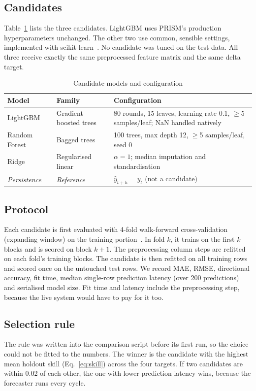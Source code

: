 \documentclass[conference]{IEEEtran}
\begin{document}
\subsection{Candidates}
Table~\ref{tab:cands} lists the three candidates. LightGBM uses PRISM's
production hyperparameters unchanged. The other two use common, sensible
settings, implemented with scikit-learn~\cite{pedregosa2011sklearn}. No
candidate was tuned on the test data. All three receive exactly the same
preprocessed feature matrix and the same delta target.

\begin{table}[t]
\centering
\caption{Candidate models and configuration}
\label{tab:cands}
\begin{tabular}{@{}p{1.7cm}p{2.4cm}p{3.2cm}@{}}
\toprule
Model & Family & Configuration \\
\midrule
LightGBM~\cite{ke2017lightgbm} & Gradient-boosted trees & 80 rounds, 15 leaves, learning rate 0.1, $\ge$5 samples/leaf; NaN handled natively \\
Random Forest~\cite{breiman2001rf} & Bagged trees & 100 trees, max depth 12, $\ge$5 samples/leaf, seed 0 \\
Ridge~\cite{hoerl1970ridge} & Regularised linear & $\alpha=1$; median imputation and standardisation \\
\midrule
\textit{Persistence} & \textit{Reference} & $\hat y_{t+h}=y_t$ (not a candidate) \\
\bottomrule
\end{tabular}
\end{table}

\subsection{Protocol}
Each candidate is first evaluated with 4-fold walk-forward cross-validation
(expanding window) on the training portion~\cite{tashman2000,bergmeir2012}. In
fold $k$, it trains on the first $k$ blocks and is scored on block $k{+}1$.
The preprocessing column steps are refitted on each fold's training blocks. The
candidate is then refitted on all training rows and scored once on the
untouched test rows. We record MAE, RMSE, directional accuracy, fit time,
median single-row prediction latency (over 200 predictions) and serialised
model size. Fit time and latency include the preprocessing step, because the
live system would have to pay for it too.

\subsection{Selection rule}
The rule was written into the comparison script before its first run, so the
choice could not be fitted to the numbers. The winner is the candidate with
the highest mean holdout skill (Eq.~\ref{eq:skill}) across the four targets.
If two candidates are within 0.02 of each other, the one with lower
prediction latency wins, because the forecaster runs every cycle.
\end{document}

